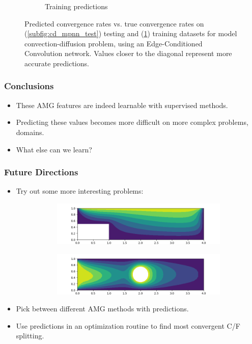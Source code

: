 \documentclass[handout]{beamer}
\begin{document}
\begin{frame}
\begin{figure}[h]
\begin{subfigure}{.48\textwidth}
    \caption{Training predictions}
    \label{subfig:cd_mpnn_train}
  \end{subfigure}
  \caption{Predicted convergence rates vs. true convergence rates on (\ref{subfig:cd_mpnn_test}) testing and (\ref{subfig:cd_mpnn_train}) training datasets for model convection-diffusion problem, using an Edge-Conditioned Convolution network. Values closer to the diagonal represent more accurate predictions.}
  \label{fig:cd_mpnn_pred}
\end{figure}
\end{frame}




\begin{frame}
  \frametitle{Conclusions}
  \begin{itemize}
  \item These AMG features are indeed learnable with supervised methods.
  \item Predicting these values becomes more difficult on more complex problems, domains.
  \item What else can we learn?
  \end{itemize}
\end{frame}

\begin{frame}
  \frametitle{Future Directions}
  \begin{itemize}
  \item Try out some more interesting problems:
  \begin{figure}[h]
  \centering
  \begin{subfigure}{.70\textwidth}
    \includegraphics[width=\textwidth]{figures/cd_bfs.png}
  \end{subfigure}
  \begin{subfigure}{.70\textwidth}
    \includegraphics[width=\textwidth]{figures/cd_cyl.png}
  \end{subfigure}
  \end{figure}
  \item Pick between different AMG methods with predictions.
  \item Use predictions in an optimization routine to find most convergent C/F splitting.
  \end{itemize}
\end{frame}
\end{document}
